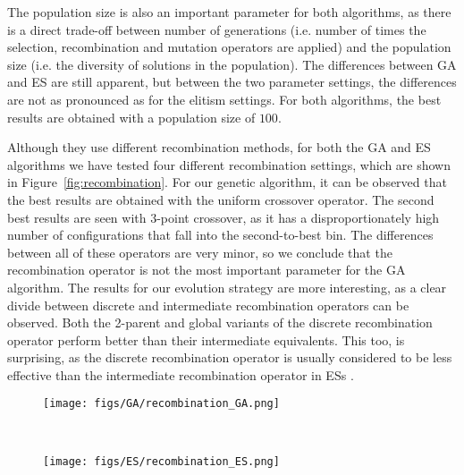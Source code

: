 \documentclass{article}
\begin{document}
The population size is also an important parameter for both algorithms, as there is a direct trade-off between number of generations (i.e. number of times the selection, recombination and mutation operators are applied) and the population size (i.e. the diversity of solutions in the population).
The differences between GA and ES are still apparent, but between the two parameter settings, the differences are not as pronounced as for the elitism settings.
For both algorithms, the best results are obtained with a population size of $100$.

\newpage

Although they use different recombination methods, for both the GA and ES algorithms we have tested four different recombination settings, which are shown in Figure~\ref{fig:recombination}.
For our genetic algorithm, it can be observed that the best results are obtained with the uniform crossover operator.
The second best results are seen with $3$-point crossover, as it has a disproportionately high number of configurations that fall into the second-to-best bin.
The differences between all of these operators are very minor, so we conclude that the recombination operator is not the most important parameter for the GA algorithm.
The results for our evolution strategy are more interesting, as a clear divide between discrete and intermediate recombination operators can be observed.
Both the 2-parent and global variants of the discrete recombination operator perform better than their intermediate equivalents.
This too, is surprising, as the discrete recombination operator is usually considered to be less effective than the intermediate recombination operator in ESs \cite{earecombination}.

\begin{figure*}[htbp]
    \centering
    \begin{subfigure}[b]{0.45\textwidth}
        \centering
        \texttt{[image: figs/GA/recombination\_GA.png]}
        \caption{}
        \label{fig:recombination_GA}
    \end{subfigure}
    ~
    \begin{subfigure}[b]{0.45\textwidth}
        \centering 
        \texttt{[image: figs/ES/recombination\_ES.png]}
        \caption{}
        \label{fig:recombination_ES}
    \end{subfigure}
    \captionsetup{width=.9\textwidth}
    \caption{
        Final function value comparison for all configurations with different recombination operators for the GA (left) and ES (right) algorithm.
    }
    \label{fig:recombination}
\end{figure*}
\end{document}

